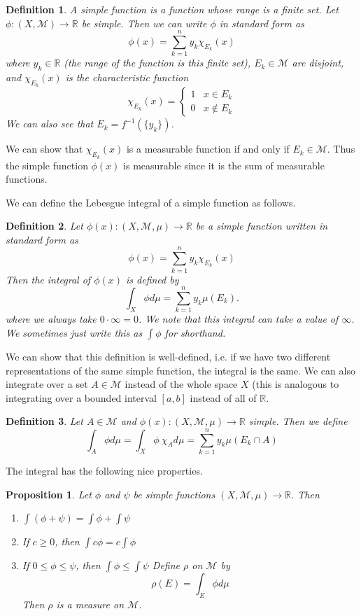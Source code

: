 \documentclass[10pt]{article}         %
\newtheorem{definition}{Definition}[section]
\newtheorem{proposition}{Proposition}[section]
\theoremstyle{remark}
\newcommand{\R}{\mathbb{R}}
\begin{document}
\begin{definition}
A \emph{simple function} is a function whose range is a finite set. Let $\phi: (X,\mathcal{M}) \rightarrow \R$ be simple. Then we can write $\phi$ in \emph{standard form} as 
\[
\phi(x) = \sum_{k = 1}^n
y_k \chi_{E_k}(x)
\]
where $y_k \in \R$ (the range of the function is this finite set), $E_k \in \mathcal{M}$ are disjoint, and $\chi_{E_k}(x)$ is the \emph{characteristic function}
\[
\chi_{E_k}(x) = \begin{cases}
    1 & x \in E_k \\
    0 & x \notin E_k
\end{cases}
\]
We can also see that $E_k = f^{-1}(\{ y_k \})$.
\end{definition}

We can show that $\chi_{E_k}(x)$ is a measurable function if and only if $E_k \in \mathcal{M}$. Thus the simple function $\phi(x)$ is measurable since it is the sum of measurable functions. 

We can define the Lebesgue integral of a simple function as follows.

\begin{definition}
Let $\phi(x): (X, \mathcal{M}, \mu) \rightarrow \R$ be a simple function written in standard form as 
\[
\phi(x) = \sum_{k = 1}^n
y_k \chi_{E_k}(x)
\]
Then the integral of $\phi(x)$ is defined by
\[
\int_X \phi d\mu = \sum\limits_{k=1}^n y_k \mu(E_k).
\]
where we always take $0 \cdot \infty = 0$. We note that this integral can take a value of $\infty$. We sometimes just write this as $\int \phi$ for shorthand. 
\end{definition}

We can show that this definition is well-defined, i.e. if we have two different representations of the same simple function, the integral is the same. We can also integrate over a set $A \in \mathcal{M}$ instead of the whole space $X$ (this is analogous to integrating over a bounded interval $[a,b]$ instead of all of $\R$.

\begin{definition}
Let $A \in \mathcal{M}$ and $\phi(x): (X, \mathcal{M}, \mu) \rightarrow \R$ simple. Then we define
\[
\int_A \phi d\mu = \int_X \phi \: \chi_A d \mu
= \sum\limits_{k=1}^n y_k \mu(E_k \cap A)
\]
\end{definition}

The integral has the following nice properties. 

\begin{proposition}
Let $\phi$ and $\psi$ be simple functions $(X, \mathcal{M}, \mu) \rightarrow \R$. Then
\begin{enumerate}
\item $\int (\phi + \psi) = \int \phi + \int \psi$
\item If $c \geq 0$, then $\int c \phi = c \int \phi$
\item If $0 \leq \phi \leq \psi$, then $\int \phi \leq \int \psi$
\int Define $\rho$ on $\mathcal{M}$ by 
\[
\rho(E) = \int_E \phi d\mu
\]
Then $\rho$ is a measure on $\mathcal{M}$.
\end{enumerate}
\end{proposition}
\end{document}
